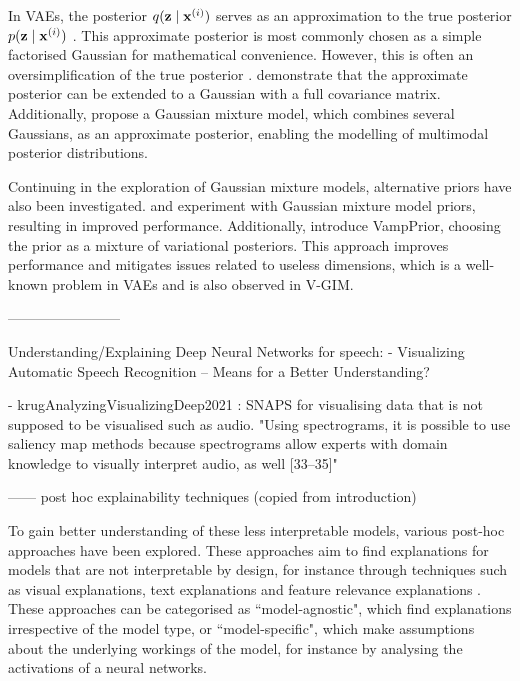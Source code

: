 	In VAEs, the posterior $q (\mathbf{z} \mid \mathbf{x}^{(i)})$ serves as an approximation to the true posterior $p (\mathbf{z} \mid \mathbf{x}^{(i)})$ \citep{odaiboTutorialDerivingStandard2019}. This approximate posterior is most commonly chosen as a simple factorised Gaussian for mathematical convenience. However, this is often an oversimplification of the true posterior \citep{nalisnickApproximateInferenceDeep2016a}. \cite{kingmaIntroductionVariationalAutoencoders2019} demonstrate that the approximate posterior can be extended to a Gaussian with a full covariance matrix. Additionally, \cite{nalisnickApproximateInferenceDeep2016a} propose a Gaussian mixture model, which combines several Gaussians, as an approximate posterior, enabling the modelling of multimodal posterior distributions.
	
	Continuing in the exploration of Gaussian mixture models, alternative priors have also been investigated. \cite{guoVariationalAutoencoderOptimizing2020} and \cite{leeMetaGMVAEMixtureGaussian2021} experiment with Gaussian mixture model priors, resulting in improved performance. Additionally, \cite{tomczakVAEVampPrior2018} introduce VampPrior, choosing the prior as a mixture of variational posteriors. This approach improves performance and mitigates issues related to useless dimensions, which is a well-known problem in VAEs and is also observed in V-GIM.
	

------------------------

Understanding/Explaining Deep Neural Networks for speech:
- Visualizing Automatic Speech Recognition – Means for a Better Understanding? \citep{markertVisualizingAutomaticSpeech2021} %

- krugAnalyzingVisualizingDeep2021 : SNAPS for visualising data that is not supposed to be visualised such as audio.
	"Using spectrograms, it is possible to use saliency map methods because spectrograms allow experts with domain knowledge to visually interpret audio, as well [33–35]" %


------ post hoc explainability techniques (copied from introduction)

To gain better understanding of these less interpretable models, various post-hoc approaches have been explored. These approaches aim to find explanations for models that are not interpretable by design, for instance through techniques such as visual explanations, text explanations and feature relevance explanations \citep{barredoarrietaExplainableArtificialIntelligence2020a}. These approaches can be categorised as ``model-agnostic", which find explanations irrespective of the model type, or ``model-specific", which make assumptions about the underlying workings of the model, for instance by analysing the activations of a neural networks.

